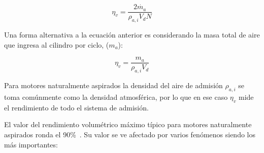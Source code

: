 \begin{equation}\label{eq:eta_v}
  \eta_v = \frac{2\dot{m_a}}{\rho_{a,i}V_d N}
\end{equation}


Una forma alternativa a la ecuación anterior es considerando la masa total de aire que
ingresa al cilindro por ciclo, ($m_{a}$):

\begin{equation}\label{eq:eta_v}
  \eta_v = \frac{m_a}{\rho_{a,i}V_d}
\end{equation}

Para motores naturalmente aspirados la densidad del aire de admisión
$\rho_{a,i}$ se toma comúnmente como la densidad atmosférica, por lo que en ese
caso $\eta_v$ mide el rendimiento de todo el sistema de admisión.
%

El valor del rendimiento volumétrico máximo típico para motores naturalmente
aspirados ronda el 90\%~\parencite{heywood}.
%
Su valor se ve afectado por varios fenómenos siendo los más importantes:

